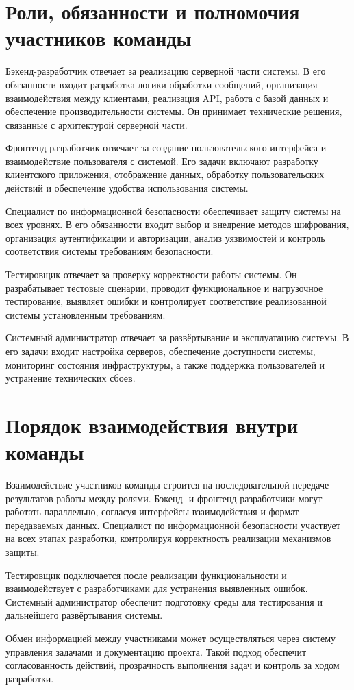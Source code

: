 \documentclass[14pt,a4paper]{extarticle}
\begin{document}
\section{Роли, обязанности и полномочия участников команды}

Бэкенд-разработчик отвечает за реализацию серверной части системы. В его обязанности входит разработка логики обработки сообщений, организация взаимодействия между клиентами, реализация API, работа с базой данных и обеспечение производительности системы. Он принимает технические решения, связанные с архитектурой серверной части.

Фронтенд-разработчик отвечает за создание пользовательского интерфейса и взаимодействие пользователя с системой. Его задачи включают разработку клиентского приложения, отображение данных, обработку пользовательских действий и обеспечение удобства использования системы.

Специалист по информационной безопасности обеспечивает защиту системы на всех уровнях. В его обязанности входит выбор и внедрение методов шифрования, организация аутентификации и авторизации, анализ уязвимостей и контроль соответствия системы требованиям безопасности.

Тестировщик отвечает за проверку корректности работы системы. Он разрабатывает тестовые сценарии, проводит функциональное и нагрузочное тестирование, выявляет ошибки и контролирует соответствие реализованной системы установленным требованиям.

Системный администратор отвечает за развёртывание и эксплуатацию системы. В его задачи входит настройка серверов, обеспечение доступности системы, мониторинг состояния инфраструктуры, а также поддержка пользователей и устранение технических сбоев.

\section{Порядок взаимодействия внутри команды}

Взаимодействие участников команды строится на последовательной передаче результатов работы между ролями. Бэкенд- и фронтенд-разработчики могут работать параллельно, согласуя интерфейсы взаимодействия и формат передаваемых данных. Специалист по информационной безопасности участвует на всех этапах разработки, контролируя корректность реализации механизмов защиты.

Тестировщик подключается после реализации функциональности и взаимодействует с разработчиками для устранения выявленных ошибок. Системный администратор обеспечит подготовку среды для тестирования и дальнейшего развёртывания системы.

Обмен информацией между участниками может осуществляться через систему управления задачами и документацию проекта. Такой подход обеспечит согласованность действий, прозрачность выполнения задач и контроль за ходом разработки.
\end{document}
